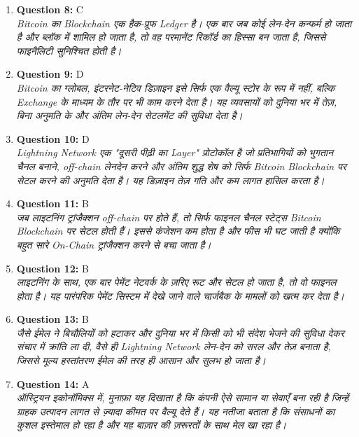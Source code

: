 \documentclass[12pt,a4paper]{article}
\begin{document}
\begin{enumerate}
\item \textbf{Question 8:} C
\\ \textit{Bitcoin का Blockchain एक हैक-प्रूफ Ledger है। एक बार जब कोई लेन-देन कन्फर्म हो जाता है और ब्लॉक में शामिल हो जाता है, तो वह परमानेंट रिकॉर्ड का हिस्सा बन जाता है, जिससे फाइनैलिटी सुनिश्चित होती है।}

\item \textbf{Question 9:} D
\\ \textit{Bitcoin का ग्लोबल, इंटरनेट-नेटिव डिज़ाइन इसे सिर्फ एक वैल्यू स्टोर के रूप में नहीं, बल्कि Exchange के माध्यम के तौर पर भी काम करने देता है। यह व्यवसायों को दुनिया भर में तेज़, बिना अनुमति के और अंतिम लेन-देन सेटलमेंट की सुविधा देता है।}

\item \textbf{Question 10:} D
\\ \textit{Lightning Network एक "दूसरी पीढ़ी का Layer" प्रोटोकॉल है जो प्रतिभागियों को भुगतान चैनल बनाने, off-chain लेनदेन करने और अंतिम शुद्ध शेष को सिर्फ Bitcoin Blockchain पर सेटल करने की अनुमति देता है। यह डिज़ाइन तेज़ गति और कम लागत हासिल करता है।}

\item \textbf{Question 11:} B
\\ \textit{जब लाइटनिंग ट्रांजैक्शन off-chain पर होते हैं, तो सिर्फ फाइनल चैनल स्टेट्स Bitcoin Blockchain पर सेटल होती हैं। इससे कंजेशन कम होता है और फीस भी घट जाती है क्योंकि बहुत सारे On-Chain ट्रांजैक्शन करने से बचा जाता है।}

\item \textbf{Question 12:} B
\\ \textit{लाइटनिंग के साथ, एक बार पेमेंट नेटवर्क के ज़रिए रूट और सेटल हो जाता है, तो वो फाइनल होता है। यह पारंपरिक पेमेंट सिस्टम में देखे जाने वाले चार्जबैक के मामलों को खत्म कर देता है।}

\item \textbf{Question 13:} B
\\ \textit{जैसे ईमेल ने बिचौलियों को हटाकर और दुनिया भर में किसी को भी संदेश भेजने की सुविधा देकर संचार में क्रांति ला दी, वैसे ही Lightning Network लेन-देन को सरल और तेज़ बनाता है, जिससे मूल्य हस्तांतरण ईमेल की तरह ही आसान और सुलभ हो जाता है।}

\item \textbf{Question 14:} A
\\ \textit{ऑस्ट्रियन इकोनॉमिक्स में, मुनाफ़ा यह दिखाता है कि कंपनी ऐसे सामान या सेवाएँ बना रही है जिन्हें ग्राहक उत्पादन लागत से ज़्यादा कीमत पर वैल्यू देते हैं। यह नतीजा बताता है कि संसाधनों का कुशल इस्तेमाल हो रहा है और यह बाज़ार की ज़रूरतों के साथ मेल खा रहा है।}


\end{enumerate}
\end{document}
